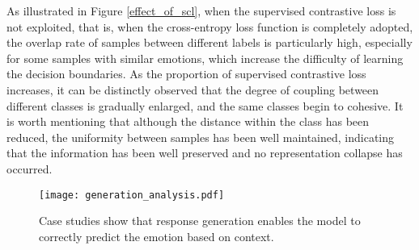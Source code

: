 \documentclass[letterpaper]{article} \usepackage{aaai22}  \usepackage{times}  \usepackage{helvet}  \usepackage{courier}  \usepackage[hyphens]{url}  \usepackage{graphicx} \urlstyle{rm} \def\UrlFont{\rm}  \usepackage{natbib}  \usepackage{caption} \DeclareCaptionStyle{ruled}{labelfont=normalfont,labelsep=colon,strut=off} \frenchspacing  \setlength{\pdfpagewidth}{8.5in}  \setlength{\pdfpageheight}{11in}  \usepackage{algorithm}
\begin{document}
As illustrated in Figure \ref{effect_of_scl}, when the supervised contrastive loss is not exploited, that is, when the cross-entropy loss function is completely adopted, the overlap rate of samples between different labels is particularly high, especially for some samples with similar emotions, which increase the difficulty of learning the decision boundaries. As the proportion of supervised contrastive loss increases, it can be distinctly observed that the degree of coupling between different classes is gradually enlarged, and the same classes begin to cohesive. It is worth mentioning that although the distance within the class has been reduced, the uniformity \cite{align_and_uniform} between samples has been well maintained, indicating that the information has been well preserved and no representation collapse has occurred.

\begin{table}[t]
\centering
{}
\caption{The F1 scores for different values of  and }
\label{alpha_of_scl}
\end{table}

\begin{figure*}[t]
\centering
\texttt{[image: generation\_analysis.pdf]} \caption{Case studies show that response generation enables the model to correctly predict the emotion based on context.}
\label{effect_of_response_generation}
\end{figure*}
\end{document}
